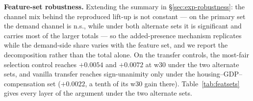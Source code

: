 \textbf{Feature-set robustness.} Extending the summary in
\S\ref{sec:exp-robustness}: the channel mix behind the reproduced lift-up is
not constant --- on the primary set the demand channel is n.s., while under
both alternate sets it is significant and carries most of the larger totals ---
so the added-presence mechanism replicates while the demand-side share varies
with the feature set, and we report the decomposition rather than the total
alone. On the transfer controls, the most-fair selection control reaches
$+0.0054$ and $+0.0072$ at w30 under the two alternate sets, and vanilla
transfer reaches sign-unanimity only under the housing--GDP--compensation set
($+0.0022$, a tenth of its w30 gain there).
Table~\ref{tab:featsets} gives every layer of the argument under the two
alternate sets.

